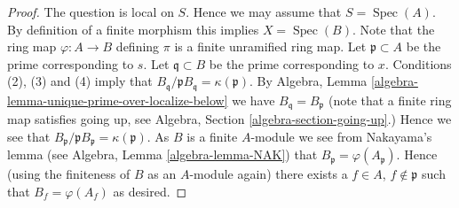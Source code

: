 \documentclass[10pt,a4paper]{amsart}
\theoremstyle{plain}
\theoremstyle{definition}
\theoremstyle{remark}
\numberwithin{equation}{subsection}
\def\Spec{\mathop{\mathrm{Spec}}}
\begin{document}
\begin{proof}
The question is local on $S$. Hence we may assume that $S = \Spec(A)$.
By definition of a finite morphism this implies $X = \Spec(B)$.
Note that the ring map $\varphi : A \to B$ defining $\pi$
is a finite unramified ring map.
Let $\mathfrak p \subset A$ be the prime corresponding to $s$.
Let $\mathfrak q \subset B$ be the prime corresponding to $x$.
Conditions (2), (3) and (4) imply that
$B_{\mathfrak q}/\mathfrak pB_{\mathfrak q} = \kappa(\mathfrak p)$.
By Algebra, Lemma \ref{algebra-lemma-unique-prime-over-localize-below}
we have $B_{\mathfrak q} = B_{\mathfrak p}$
(note that a finite ring map satisfies going up, see
Algebra, Section \ref{algebra-section-going-up}.)
Hence we see that
$B_{\mathfrak p}/\mathfrak pB_{\mathfrak p} = \kappa(\mathfrak p)$.
As $B$ is a finite $A$-module we see from Nakayama's lemma (see
Algebra, Lemma \ref{algebra-lemma-NAK})
that $B_{\mathfrak p} = \varphi(A_{\mathfrak p})$. Hence (using the finiteness
of $B$ as an $A$-module again) there exists a
$f \in A$, $f \not \in \mathfrak p$ such that $B_f = \varphi(A_f)$
as desired.
\end{proof}
\end{document}
